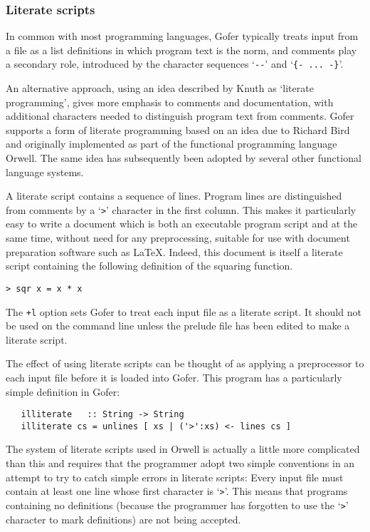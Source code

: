 \subsubsection{Literate scripts}
In common with most programming languages, Gofer typically treats input
from a file as a list definitions in which program text is the norm,
and comments play a secondary role, introduced by the character
sequences `\verb"--"' and `\verb"{- ... -}"'.

An alternative approach, using an idea described by Knuth as `literate
programming', gives more emphasis to comments and documentation, with
additional characters needed to distinguish program text from comments.
Gofer supports a form of literate programming based on an idea due to
Richard Bird and originally implemented as part of the functional
programming language Orwell.  The same idea has subsequently been
adopted by several other functional language systems.

A literate script contains a sequence of lines.  Program lines are
distinguished from comments by a `\verb">"' character in the first column.
This makes it particularly easy to write a document which is both an
executable program script and at the same time, without need for any
preprocessing, suitable for use with document preparation software such
as LaTeX.  Indeed, this document is itself a literate script containing
the following definition of the squaring function.
\begin{verbatim}
> sqr x = x * x
\end{verbatim}
The \verb"+l" option sets Gofer to treat each input file as a literate
script.  It should not be used on the command line unless the prelude
file has been edited to make a literate script.

The effect of using literate scripts can be thought of as applying a
preprocessor to each input file before it is loaded into Gofer.  This
program has a particularly simple definition in Gofer:
\begin{verbatim}
   illiterate   :: String -> String
   illiterate cs = unlines [ xs | ('>':xs) <- lines cs ]
\end{verbatim}
The system of literate scripts used in Orwell is actually a little more
complicated than this and requires that the programmer adopt two simple
conventions in an attempt to try to catch simple errors in literate
scripts:
\BI
\IT Every input file must contain at least one line whose first
     character is `\verb">"'.  This means that programs containing no
     definitions (because the programmer has forgotten to use the `\verb">"'
     character to mark definitions) are not being accepted.

